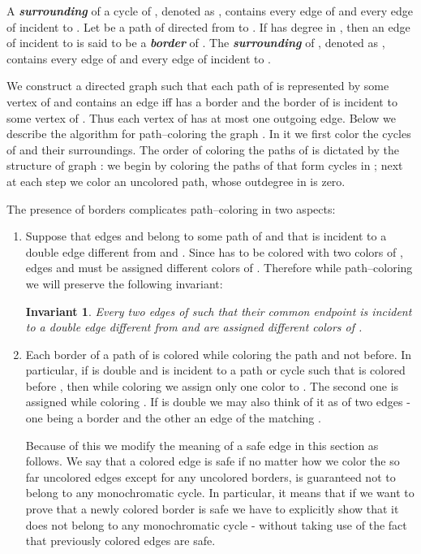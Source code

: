 \documentclass[a4, 11pt]{article}
\newcommand{\<}{\langle}
\renewcommand{\>}{\rangle}
\newtheorem{invariant}{Invariant}
\begin{document}
A {\bf \em surrounding} of a cycle  of , denoted as , contains  every edge of  and  every edge of  incident to .
Let  be a path of  directed from  to . If  has degree  in , then an edge  of  incident to  is said to be a {\bf \em border} of .
The {\bf \em surrounding} of  , denoted as , contains  every edge of   and every edge of  incident to .  

We construct a directed graph  such that each path of  is represented by some vertex of  and  contains an edge  iff  has a border and the border of  is incident to some vertex of .
Thus each vertex of  has at most one outgoing edge. Below we describe the algorithm for path--coloring the graph . In it we first color the cycles of  and their surroundings.  The order of coloring the paths of 
is dictated by the structure of graph : we begin by coloring the paths of  that form cycles in ; next at each step we color an uncolored path, whose outdegree in  is zero.


The presence of borders complicates path--coloring in two aspects:
\begin{enumerate}
\item Suppose that edges  and  belong to some path of  and that  is incident to a double edge  different from  and .
Since  has to be colored with two colors of , edges  and  must be assigned different colors of . Therefore while path--coloring  we will preserve the following invariant:
\begin{invariant}\label{invdouble}
Every two edges  of  such that their common endpoint  is incident to a double edge  different from  and  are assigned different colors of . 
\end{invariant}

\item Each border  of a path  of  is colored while coloring the path  and not before. In particular, if  is double and is incident to a path or cycle  such that  is colored before , then while coloring  we assign only one color to . The second one is assigned while coloring .
If  is double we may also think of it as of two edges - one being a border and the other an edge of the matching .

Because of this we modify the meaning of a safe edge in this section as follows. We say that a colored edge  is safe if no matter how we color the so far uncolored edges except for any uncolored borders,  is guaranteed not to belong to any monochromatic cycle. In particular, it means that if we want to prove that a newly colored border  is safe we have to explicitly show that it does not belong to any monochromatic cycle - without taking use of the fact that previously colored 
edges are safe.

\end{enumerate}
\end{document}
